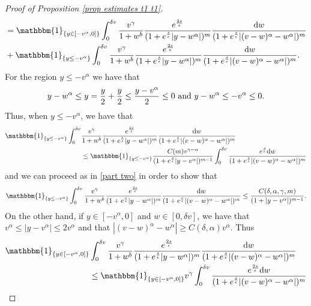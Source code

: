 \documentclass[11pt]{article}
\numberwithin{equation}{section}
\newcommand{\der}{\textup{d}}
\begin{document}
\begin{proof}[Proof of Proposition 
\ref{prop estimates t1 t1}]
\begin{align*}
    &  =    \mathbbm{1}_{\{y\in[-v^{\alpha},0]\}}  \int_{0}^{\delta v} \frac{v^{\gamma}}{1+w^{b}}\frac{e^{\frac{2s}{\epsilon}}}{(1+e^{\frac{s}{\epsilon}}|y-w^{\alpha}|)^{m}}\frac{\der w}{(1+e^{\frac{s}{\epsilon}}|(v-w)^{\alpha}-w^{\alpha}|)^{m}}\\
    & +  \mathbbm{1}_{\{y\leq -v^{\alpha}\}} \int_{0}^{\delta v}\frac{v^{\gamma}}{1+w^{b}}\frac{e^{\frac{2s}{\epsilon}}}{(1+e^{\frac{s}{\epsilon}}|y-w^{\alpha}|)^{m}}\frac{\der w}{(1+e^{\frac{s}{\epsilon}}|(v-w)^{\alpha}-w^{\alpha}|)^{m}}.
\end{align*}
For the region $y\leq -v^{\alpha}$ we have that 
\begin{align*}
    y-w^{\alpha}\leq y = \frac{y}{2}+\frac{y}{2}\leq \frac{y-v^{\alpha}}{2}\leq 0 \textup{ and } y-w^{\alpha}\leq -v^{\alpha}\leq 0.
\end{align*}
Thus, when $y\leq -v^{\alpha}$, we have that
\begin{align*}
   \mathbbm{1}_{\{y\leq -v^{\alpha}\}}   \int_{0}^{\delta v} & \frac{v^{\gamma}}{1+w^{b}}\frac{e^{\frac{2s}{\epsilon}}}{(1+e^{\frac{s}{\epsilon}}|y-w^{\alpha}|)^{m}}\frac{\der w}{(1+e^{\frac{s}{\epsilon}}|(v-w)^{\alpha}-w^{\alpha}|)^{m}}\\
      &\leq\mathbbm{1}_{\{y\leq -v^{\alpha}\}} \frac{C(m)v^{\gamma-\alpha}}{(1+e^{\frac{s}{\epsilon}}|y-v^{\alpha}|)^{m-1}}  \int_{0}^{\delta v} \frac{e^{\frac{s}{\epsilon}}\der w}{(1+e^{\frac{s}{\epsilon}}|(v-w)^{\alpha}-w^{\alpha}|)^{m}}
\end{align*}
and we can proceed as in \eqref{part two} in order to show that
\begin{align*}
      \mathbbm{1}_{\{y\leq -v^{\alpha}\}} \int_{0}^{\delta v}\frac{v^{\gamma}}{1+w^{b}}\frac{e^{\frac{2s}{\epsilon}}}{(1+e^{\frac{s}{\epsilon}}|y-w^{\alpha}|)^{m}}\frac{\der w}{(1+e^{\frac{s}{\epsilon}}|(v-w)^{\alpha}-w^{\alpha}|)^{m}}\leq   \frac{C(\delta,\alpha,\gamma,m)}{(1+|y-v^{\alpha}|)^{m-1}}.
\end{align*}
On the other hand, if $y\in[-v^{\alpha},0]$ and $w\in[0,\delta v]$, we have that $v^{\alpha}\leq |y-v^{\alpha}|\leq  2v^{\alpha}$ and that $|(v-w)^{\alpha}-w^{\alpha}|\geq C(\delta,\alpha) v^{\alpha}$. Thus
\begin{align*}
    \mathbbm{1}_{\{y\in[-v^{\alpha},0]\}}&   \int_{0}^{\delta v}\frac{v^{\gamma}}{1+w^{b}}\frac{e^{\frac{2s}{\epsilon}}}{(1+e^{\frac{s}{\epsilon}}|y-w^{\alpha}|)^{m}}\frac{\der w}{(1+e^{\frac{s}{\epsilon}}|(v-w)^{\alpha}-w^{\alpha}|)^{m}}\\
       &\leq  \mathbbm{1}_{\{y\in[-v^{\alpha},0]\}} v^{\gamma}\int_{0}^{\delta v}\frac{e^{\frac{2s}{\epsilon}}\der w}{(1+e^{\frac{s}{\epsilon}}|(v-w)^{\alpha}-w^{\alpha}|)^{m}}\\

\end{align*}
\end{proof}
\end{document}
